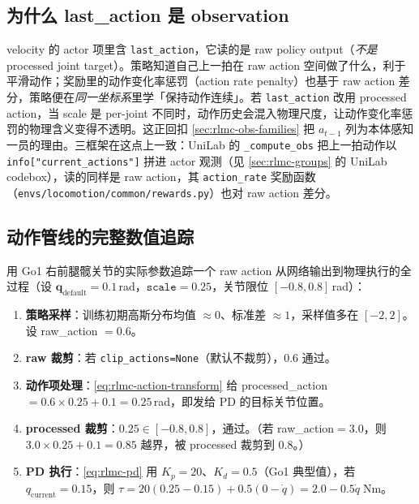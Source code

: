 \subsection{为什么 last\_action 是 observation}
\label{sec:rlmc-lastaction}

velocity 的 actor 项里含 \verb|last_action|，它读的是 raw policy output（\emph{不是} processed joint target）。策略知道自己上一拍在 raw action 空间做了什么，利于平滑动作；奖励里的动作变化率惩罚（action rate penalty）也基于 raw action 差分，策略便在\emph{同一坐标系}里学「保持动作连续」。若 \verb|last_action| 改用 processed action，当 scale 是 per-joint 不同时，动作历史会混入物理尺度，让动作变化率惩罚的物理含义变得不透明。这正回扣 \cref{sec:rlmc-obs-families} 把 $a_{t-1}$ 列为本体感知一员的理由。三框架在这点上一致：UniLab 的 \verb|_compute_obs| 把上一拍动作以 \verb|info["current_actions"]| 拼进 actor 观测（见 \cref{sec:rlmc-groups} 的 UniLab codebox），读的同样是 raw action，其 \verb|action_rate| 奖励函数（\verb|envs/locomotion/common/rewards.py|）也对 raw action 差分。

\subsection{动作管线的完整数值追踪}
\label{sec:rlmc-action-trace}

用 Go1 右前腿髋关节的实际参数追踪一个 raw action 从网络输出到物理执行的全过程（设 $\mathbf q_{\text{default}}=0.1\,$rad，$\texttt{scale}=0.25$，关节限位 $[-0.8,0.8]\,$rad）：

\begin{enumerate}
  \item \textbf{策略采样}：训练初期高斯分布均值 $\approx 0$、标准差 $\approx 1$，采样值多在 $[-2,2]$。设 raw\_action $=0.6$。
  \item \textbf{raw 裁剪}：若 \verb|clip_actions=None|（默认不裁剪），$0.6$ 通过。
  \item \textbf{动作项处理}：\cref{eq:rlmc-action-transform} 给 processed\_action $=0.6\times0.25+0.1=0.25\,$rad，即发给 PD 的目标关节位置。
  \item \textbf{processed 裁剪}：$0.25\in[-0.8,0.8]$，通过。（若 raw\_action$=3.0$，则 $3.0\times0.25+0.1=0.85$ 越界，被 processed 裁剪到 $0.8$。）
  \item \textbf{PD 执行}：\cref{eq:rlmc-pd} 用 $K_p=20$、$K_d=0.5$（Go1 典型值），若 $q_{\text{current}}=0.15$，则 $\tau=20(0.25-0.15)+0.5(0-\dot q)=2.0-0.5\dot q\;$Nm。
\end{enumerate}


